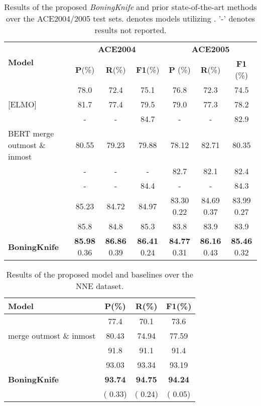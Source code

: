 \documentclass[11pt,a4paper]{article}
\begin{document}
\begin{table*}[!t]
   \centering
   \vskip 0.1in
\begin{tabular}{@{}l|ccc|ccc@{}}
   \toprule
   \multirow{2}{*}{\textbf{Model}} & \multicolumn{3}{c|}{\textbf{ACE2004}} & \multicolumn{3}{c}{\textbf{ACE2005}} \\ \cmidrule(l){2-7} 
    & \textbf{P}(\%) & \textbf{R}(\%) & \textbf{F1}(\%) & \textbf{P} (\%) & \textbf{R}(\%) & \textbf{F1} (\%) \\ \midrule
\citet{wang2018neural}      &78.0  & 72.4  & 75.1  &76.8  & 72.3  & 74.5  \\
      \citet{xia2019multi} [ELMO] &81.7  & 77.4  & 79.5  &79.0  & 77.3  & 78.2  \\
      \citet{luan2019general}     &   -  &   -   & 84.7  &   -  &   -   & 82.9 \\
      \hline
      {BERT} merge outmost \& inmost&80.55 & 79.23 & 79.88 &78.12 & 82.71 & 80.35 \\
      \citet{fisher2019merge}     &   -  &   -   &   -   &82.7  & 82.1  & 82.4  \\
      \citet{strakov2019neural}   &   -  &   -   & 84.4  &   -  &   -   & 84.3  \\
      \citet{shibuya2019nested}   &85.23 & 84.72 & 84.97 &83.30  0.22 & 84.69  0.37 & 83.99  0.27 \\
      \citet{tan2020boundary}    &85.8 & 84.8 & 85.3 &83.8 & 83.9 & 83.9 \\
\hline
      \textbf{BoningKnife}         &\textbf{85.98}  0.36  & \textbf{86.86}  0.39 & \textbf{86.41}  0.24 &\textbf{84.77}  0.31 & \textbf{86.16}  0.43 & \textbf{85.46}  0.32 \\
    \bottomrule
   \end{tabular}\caption{Results of the proposed \textit{BoningKnife} and prior state-of-the-art methods over the ACE2004/2005 test sets.  denotes models utilizing . '-' denotes results not reported.}
   \label{tab:main_results}
\end{table*}
    \begin{table}[!t]
\centering
\vskip 0.1in
\begin{tabular}{@{}lccc@{}}
\toprule
\textbf{Model} & \textbf{P}(\%) & \textbf{R}(\%) & \textbf{F1}(\%) \\ \midrule
 \citet{wang2018transition}   &77.4  & 70.1  & 73.6  \\
  merge outmost \& inmost&80.43 & 74.94 & 77.59 \\
 \citet{wang2018neural}      &91.8  & 91.1  & 91.4  \\
 \citet{shibuya2019nested}\footnotemark &93.03  & 93.34  & 93.19  \\
 \hline
 \textbf{BoningKnife}        &\textbf{93.74} & \textbf{94.75} & \textbf{94.24}  \\
                             &( 0.33) & ( 0.24) & ( 0.05) \\
\bottomrule
\end{tabular}\caption{Results of the proposed model and baselines over the NNE dataset.}
\label{tab:nne_result}
\end{table} 
\end{document}
